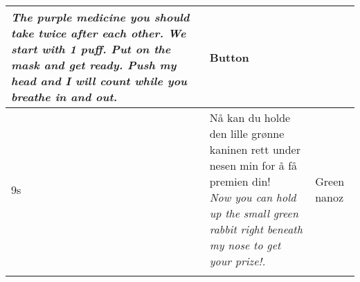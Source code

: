 \begin{center}
\begin{longtable}{|p{1.2cm}|p{13.5cm}|p{2cm}|}
{								\emph{The purple medicine you should take twice after each other. We start with 1 puff. Put on the mask and get ready. Push my head and I will count while you breathe in and out.}} & Button \\
			\hline
			9s & \specialcell{13.5cm}{N{\aa} kan du holde den lille gr{\o}nne kaninen rett under nesen min for {\aa} f{\aa} premien din! \\
								\emph{Now you can hold up the small green rabbit right beneath my nose to get your prize!.}} & Green nanoz \\
			\hline
			\label{tab:karotzmanuscript}
		\end{longtable}
	\end{center}
